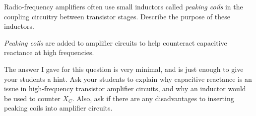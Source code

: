 

Radio-frequency amplifiers often use small inductors called {\it peaking coils} in the coupling circuitry between transistor stages.  Describe the purpose of these inductors.







{\it Peaking coils} are added to amplifier circuits to help counteract capacitive reactance at high frequencies.







The answer I gave for this question is very minimal, and is just enough to give your students a hint.  Ask your students to explain why capacitive reactance is an issue in high-frequency transistor amplifier circuits, and why an inductor would be used to counter $X_C$.  Also, ask if there are any disadvantages to inserting peaking coils into amplifier circuits.




